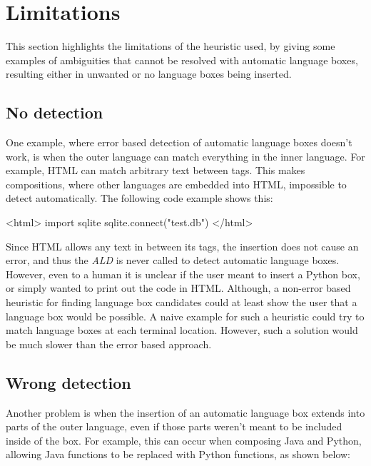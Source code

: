 \documentclass[sigplan,screen]{acmart}\settopmatter{printfolios=true,printccs=false,printacmref=false}
\newcommand{\ald}[0]{\emph{ALD}\xspace}
\begin{document}
\section{Limitations}
\label{sec_lbox_limitations}

This section highlights the limitations of the heuristic used, by giving some
examples of ambiguities that cannot be resolved with automatic language boxes,
resulting either in unwanted or no language boxes being inserted.

\subsection{No detection}

One example, where error based detection of automatic language boxes doesn't
work, is when the outer language can match everything in the inner language.
For example, HTML can match arbitrary text between tags. This makes
compositions, where other languages are embedded into HTML, impossible to
detect automatically. The following code example shows this:

\begin{lstdefault}[language=html]
<html>
import sqlite
sqlite.connect("test.db")
</html>
\end{lstdefault}
\vspace{1em}

Since HTML allows any text in between its tags, the insertion does not cause an
error, and thus the \ald is never called to detect automatic language boxes.
However, even to a human it is unclear if the user meant to insert a Python
box, or simply wanted to print out the code in HTML. Although, a non-error
based heuristic for finding language box candidates could at least show the
user that a language box would be possible.  A naive example for such a
heuristic could try to match language boxes at each terminal location. However,
such a solution would be much slower than the error based approach.

\subsection{Wrong detection}

Another problem is when the insertion of an automatic language box extends into
parts of the outer language, even if those parts weren't meant to be included
inside of the box. For example, this can occur when composing Java and Python,
allowing Java functions to be replaced with Python functions, as shown below:
\end{document}
